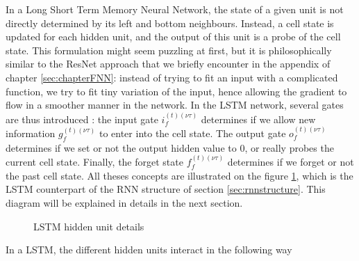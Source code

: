 In a Long Short Term Memory Neural Network\cite{Gers:2000:LFC:1121912.1121915}, the state of a given unit is not directly determined by its left and bottom neighbours. Instead, a cell state is updated for each hidden unit, and the output of this unit is a probe of the cell state. This formulation might seem puzzling at first, but it is philosophically similar to the ResNet approach that we briefly encounter in the appendix of chapter \ref{sec:chapterFNN}: instead of trying to fit an input with a complicated function, we try to fit tiny variation of the input, hence allowing the gradient to flow in a smoother manner in the network. In the LSTM network, several gates are thus introduced : the input gate $i^{(t)(\nu\tau)}_f$ determines if we allow new information $g^{(t)(\nu\tau)}_f$ to enter into the cell state. The output gate $o^{(t)(\nu\tau)}_f$ determines if we set or not the output hidden value to $0$, or really probes the current cell state. Finally, the forget state $f^{(t)(\nu\tau)}_f$ determines if we forget or not the past cell state. All theses concepts are illustrated on the figure \ref{fig:Lstm1}, which is the LSTM counterpart of the RNN structure of section \ref{sec:rnnstructure}. This diagram will be explained in details in the next section.

\begin{figure}[H]
\begin{center}
\caption{\label{fig:Lstm1}LSTM hidden unit details}
\end{center}
\end{figure}

In a LSTM, the different hidden units interact in the following way

